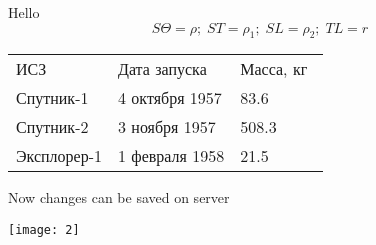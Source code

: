 \documentclass[a4paper,12pt]{article}
\begin{document}
Hello
\[S\Theta = \rho;\;ST = \rho_1;\;SL = \rho_2;\;TL = r\]
\begin{tabular}{ l l l }
ИСЗ & Дата запуска & Масса, кг  \\
Спутник-1 & 4 октября 1957 & 83.6 \\
Спутник-2 & 3 ноября 1957 & 508.3  \\
Эксплорер-1 & 1 февраля 1958 & 21.5 \\
\end{tabular}



Now changes can be saved on server



\texttt{[image: 2]}
\end{document}
